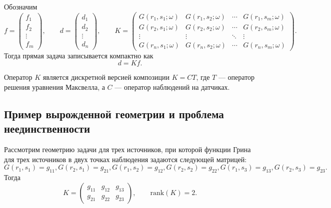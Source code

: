 \documentclass[sn-mathphys-num]{bst/sn-jnl}
\theoremstyle{thmstylethree}
\theoremstyle{thmstyletwo}
\theoremstyle{thmstyleone}
\begin{document}
Обозначим
\begin{equation}
    f=\begin{pmatrix}f_1\\ f_2 \\ \vdots \\ f_m\end{pmatrix},
    \qquad
    d=\begin{pmatrix}d_1\\ d_2 \\ \vdots \\ d_n\end{pmatrix},
    \qquad
    K=\begin{pmatrix}
        G(r_1,s_1;\omega) & G(r_1,s_2;\omega) & \cdots & G(r_1,s_m;\omega)\\
        G(r_2,s_1;\omega) & G(r_2,s_2;\omega) & \cdots & G(r_2,s_m;\omega)\\
        \vdots & \vdots & \ddots & \vdots\\
        G(r_n,s_1;\omega) & G(r_n,s_2;\omega) & \cdots & G(r_n,s_m;\omega)
    \end{pmatrix}.
\end{equation}
Тогда прямая задача записывается компактно как
\begin{equation}\label{eq:direct_matrix}
    d=Kf.
\end{equation}

Оператор $K$ является дискретной версией композиции $K=C T$, где $T$ — оператор решения уравнения Максвелла, 
а $C$ — оператор наблюдений на датчиках.

\subsection{Пример вырожденной геометрии и проблема неединственности}

Рассмотрим геометрию задачи для трех источников, 
при которой функции Грина для трех источников в двух точках наблюдения задаются следующей матрицей:
\begin{equation}\label{eq:degenerate_G}
    G(r_1,s_1)=g_{11}, G(r_2,s_1)=g_{21},
    G(r_1,s_2)=g_{12}, G(r_2,s_2)=g_{22},
    G(r_1,s_3)=g_{13}, G(r_2,s_3)=g_{23}.
\end{equation}
Тогда
\begin{equation}\label{eq:K_rank1}
    K=\begin{pmatrix}g_{11} & g_{12} & g_{13}\\ g_{21} & g_{22} & g_{23}\end{pmatrix},
    \qquad \mathrm{rank}(K)=2.
\end{equation}
\end{document}

